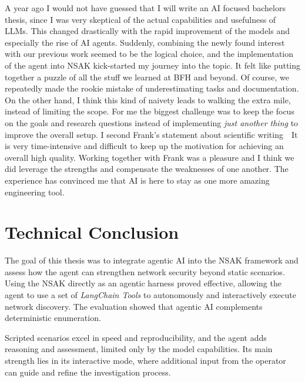 A year ago I would not have guessed that I will write an \gls{AI} focused bachelors thesis,
since I was very skeptical of the actual capabilities and usefulness of \glspl{LLM}.
This changed drastically with the rapid improvement of the models and especially the rise of \gls{AI} agents.
Suddenly, combining the newly found interest with our previous work seemed to be the logical choice,
and the implementation of the agent into \gls{NSAK} kick-started my journey into the topic.
It felt like putting together a puzzle of all the stuff we learned at BFH and beyond.
Of course, we repeatedly made the rookie mistake of underestimating tasks and documentation.
On the other hand, I think this kind of naivety leads to walking the extra mile,
instead of limiting the scope.
For me the biggest challenge was to keep the focus on the goals and research questions instead of implementing \textit{just another thing} to improve the overall setup.
I second Frank's statement about scientific writing~\textthreequartersemdash~It is very time-intensive and difficult to keep up the motivation for achieving an overall high quality.
Working together with Frank was a pleasure and I think we did leverage the strengths and compensate the weaknesses of one another.
The experience has convinced me that \gls{AI} is here to stay as one more amazing engineering tool.

\section{Technical Conclusion}\label{sec:tecnical-conclussion}
The goal of this thesis was to integrate agentic \gls{AI} into the \gls{NSAK} framework and assess how the agent can strengthen network security beyond static scenarios. Using the \gls{NSAK} directly as an agentic harness proved effective, allowing the agent to use a set of \textit{LangChain Tools} to autonomously and interactively execute network discovery.
The evaluation showed that agentic \gls{AI} complements deterministic enumeration.

Scripted scenarios excel in speed and reproducibility, and the agent adds reasoning and assessment, limited only by the model capabilities.
Its main strength lies in its interactive mode, where additional input from the operator can guide and refine the investigation process.

